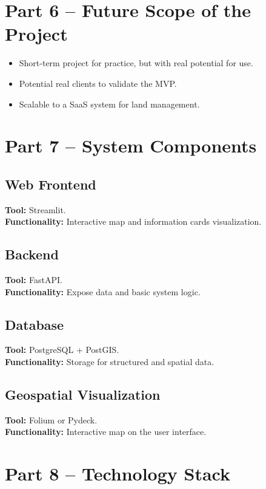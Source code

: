 \documentclass[12pt]{article}
\begin{document}
\vspace{1 in}

\section{Part 6 – Future Scope of the Project}

\begin{itemize}
  \item Short-term project for practice, but with real potential for use.
  \item Potential real clients to validate the MVP.
  \item Scalable to a SaaS system for land management.
\end{itemize}

\section{Part 7 – System Components}

\subsection*{Web Frontend}
\textbf{Tool:} Streamlit.\\
\textbf{Functionality:} Interactive map and information cards visualization.

\subsection*{Backend}
\textbf{Tool:} FastAPI.\\
\textbf{Functionality:} Expose data and basic system logic.

\subsection*{Database}
\textbf{Tool:} PostgreSQL + PostGIS.\\
\textbf{Functionality:} Storage for structured and spatial data.

\subsection*{Geospatial Visualization}
\textbf{Tool:} Folium or Pydeck.\\
\textbf{Functionality:} Interactive map on the user interface.

\section{Part 8 – Technology Stack}
\end{document}
